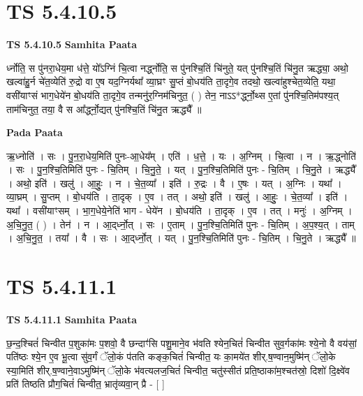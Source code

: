 \documentclass[17pt]{extarticle}
\begin{document}

\section{ TS 5.4.10.5 }

\textbf{TS 5.4.10.5 } \newline
\textbf{Samhita Paata} \newline

र्ध्नोति॒ स पु॑नरा॒धेय॒मा ध॑त्ते॒ यो᳚ऽग्निं चि॒त्वा नर्द्ध्नोति॒ स पु॑नश्चि॒तिं चि॑नुते॒ यत् पु॑नश्चि॒तिं चि॑नु॒त ऋद्ध्या॒ अथो॒ खल्वा॑हु॒र्न चे॑त॒व्येति॑ रु॒द्रो वा ए॒ष यद॒ग्निर्यथा᳚ व्या॒घ्रꣳ सु॒प्तं बो॒धय॑ति ता॒दृगे॒व तदथो॒ खल्वा॑हुश्चेत॒व्येति॒ यथा॒ वसी॑याꣳसं भाग॒धेये॑न बो॒धय॑ति ता॒दृगे॒व तन्मनु॑र॒ग्निम॑चिनुत॒ ( ) तेन॒ नाऽऽ*र्द्ध्नो॒थ्स ए॒तां पु॑नश्चि॒तिम॑पश्य॒त् ताम॑चिनुत॒ तया॒ वै स आ᳚र्द्ध्नो॒द्यत् पु॑नश्चि॒तिं चि॑नु॒त ऋद्ध्यै᳚ ॥ \newline

\textbf{Pada Paata} \newline

ऋ॒ध्नोति॑ । सः । पु॒न॒रा॒धेय॒मिति॑ पुनः-आ॒धेय᳚म् । एति॑ । ध॒त्ते॒ । यः । अ॒ग्निम् । चि॒त्वा । न । ऋ॒द्ध्नोति॑ । सः । पु॒न॒श्चि॒तिमिति॑ पुनः - चि॒तिम् । चि॒नु॒ते॒ । यत् । पु॒न॒श्चि॒तिमिति॑ पुनः - चि॒तिम् । चि॒नु॒ते । ऋद्ध्यै᳚ । अथो॒ इति॑ । खलु॑ । आ॒हुः॒ । न । चे॒त॒व्या᳚ । इति॑ । रु॒द्रः । वै । ए॒षः । यत् । अ॒ग्निः । यथा᳚ । व्या॒घ्रम् । सु॒प्तम् । बो॒धय॑ति । ता॒दृक् । ए॒व । तत् । अथो॒ इति॑ । खलु॑ । आ॒हुः॒ । चे॒त॒व्या᳚ । इति॑ । यथा᳚ । वसी॑याꣳसम् । भा॒ग॒धेये॒नेति॑ भाग - धेये॑न । बो॒धय॑ति । ता॒दृक् । ए॒व । तत् । मनुः॑ । अ॒ग्निम् । अ॒चि॒नु॒त॒ ( ) । तेन॑ । न । आ॒द्‌र्ध्नो॒त् । सः । ए॒ताम् । पु॒न॒श्चि॒तिमिति॑ पुनः - चि॒तिम् । अ॒प॒श्य॒त् । ताम् । अ॒चि॒नु॒त॒ । तया᳚ । वै । सः । आ॒द्‌र्ध्नो॒त् । यत् । पु॒न॒श्चि॒तिमिति॑ पुनः - चि॒तिम् । चि॒नु॒ते । ऋद्ध्यै᳚ ॥  \newline





\section{ TS 5.4.11.1 }

\textbf{TS 5.4.11.1 } \newline
\textbf{Samhita Paata} \newline

छ॒न्द॒श्चितं॑ चिन्वीत प॒शुका॑मः प॒शवो॒ वै छन्दाꣳ॑सि पशु॒माने॒व भ॑वति श्येन॒चितं॑ चिन्वीत सुव॒र्गका॑मः श्ये॒नो वै वय॑सां॒ पति॑ष्ठः श्ये॒न ए॒व भू॒त्वा सु॑व॒र्गं ॅलो॒कं प॑तति कङ्क॒चितं॑ चिन्वीत॒ यः का॒मये॑त शीर्.ष॒ण्वान॒मुष्मि॑न् ॅलो॒के स्या॒मिति॑ शीर्.ष॒ण्वाने॒वाऽमुष्मि॑न् ॅलो॒के भ॑वत्यलज॒चितं॑ चिन्वीत॒ चतु॑स्सीतं प्रति॒ष्ठाका॑म॒श्चत॑स्रो॒ दिशो॑ दि॒क्ष्वे॑व प्रति॑ तिष्ठति प्रौग॒चितं॑ चिन्वीत॒ भ्रातृ॑व्यवा॒न् प्रै - [  ] \newline
\end{document}
